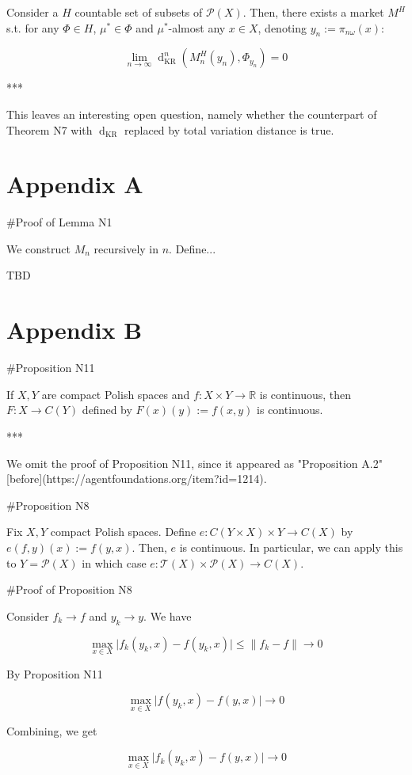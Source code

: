 \documentclass[a4paper]{article}
\newcommand{\Reals}{\mathbb{R}}
\newcommand{\Abs}[1]{\lvert #1 \rvert}
\newcommand{\Norm}[1]{\lVert #1 \rVert}
\newcommand{\Prob}{\mathcal{P}}
\newcommand{\T}{\mathcal{T}}
\newcommand{\Dkr}{\operatorname{d}_{\text{KR}}}
\begin{document}
Consider a ${H}$ countable set of subsets of ${\Prob(X)}$. Then, there exists a market ${M^H}$ s.t. for any ${\Phi \in H}$, ${\mu^* \in \Phi}$ and ${\mu^*}$-almost any ${x \in X}$, denoting ${y_n:=\pi_{n\omega}(x)}$:

$$\lim_{n \rightarrow \infty} \Dkr^n(M^H_n(y_n),\Phi_{y_n}) = 0$$

***

This leaves an interesting open question, namely whether the counterpart of Theorem N7 with ${\Dkr}$ replaced by total variation distance is true.

\section{Appendix A}

\#Proof of Lemma N1

We construct ${M_n}$ recursively in ${n}$. Define...

TBD

\section{Appendix B}

\#Proposition N11

If ${X,Y}$ are compact Polish spaces and ${f: X \times Y \rightarrow \Reals}$ is continuous, then ${F: X \rightarrow C(Y)}$ defined by ${F(x)(y):=f(x,y)}$ is continuous.

***

We omit the proof of Proposition N11, since it appeared as "Proposition A.2" [before](https://agentfoundations.org/item?id=1214).

\#Proposition N8

Fix ${X,Y}$ compact Polish spaces. Define ${e: C(Y \times X) \times Y \rightarrow C(X)}$ by ${e(f,y)(x):=f(y,x)}$. Then, ${e}$ is continuous. In particular, we can apply this to ${Y = \Prob(X)}$ in which case ${e: \T(X) \times \Prob(X) \rightarrow C(X)}$.

\#Proof of Proposition N8

Consider ${f_k \rightarrow f}$ and ${y_k \rightarrow y}$. We have

$$\max_{x \in X} \Abs{f_k(y_k,x)-f(y_k,x)} \leq \Norm{f_k - f} \rightarrow 0$$

By Proposition N11

$$\max_{x \in X} \Abs{f(y_k,x)-f(y,x)} \rightarrow 0$$

Combining, we get

$$\max_{x \in X} \Abs{f_k(y_k,x)-f(y,x)} \rightarrow 0$$
\end{document}
